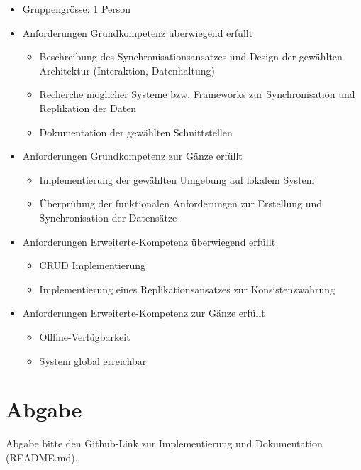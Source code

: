 \begin{itemize}
	\item Gruppengrösse: 1 Person
	\item Anforderungen \glqq Grundkompetenz überwiegend erfüllt\grqq
	\begin{itemize}
		\item Beschreibung des Synchronisationsansatzes und Design der gewählten Architektur (Interaktion, Datenhaltung)
		\item Recherche möglicher Systeme bzw. Frameworks zur Synchronisation und Replikation der Daten
		\item Dokumentation der gewählten Schnittstellen
	\end{itemize}
	\item Anforderungen \glqq Grundkompetenz zur Gänze erfüllt\grqq
	\begin{itemize}
		\item Implementierung der gewählten Umgebung auf lokalem System
		\item Überprüfung der funktionalen Anforderungen zur Erstellung und Synchronisation der Datensätze
	\end{itemize}
	\item Anforderungen \glqq Erweiterte-Kompetenz überwiegend erfüllt\grqq
	\begin{itemize}
		\item CRUD Implementierung
		\item Implementierung eines Replikationsansatzes zur Konsistenzwahrung
	\end{itemize}
	\item Anforderungen \glqq Erweiterte-Kompetenz zur Gänze erfüllt\grqq
	\begin{itemize}
		\item Offline-Verfügbarkeit
		\item System global erreichbar
	\end{itemize}
\end{itemize}

\section{Abgabe}
Abgabe bitte den Github-Link zur Implementierung und Dokumentation (README.md).

\clearpage
